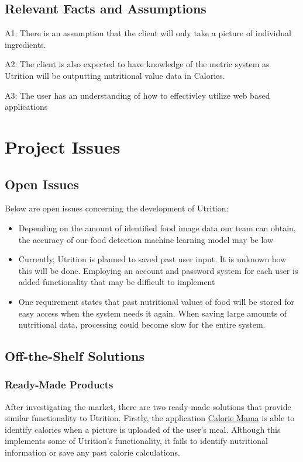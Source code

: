 \documentclass[12pt]{article}
\begin{document}
{\subsection{Relevant Facts and Assumptions } 


A1: There is an assumption that the client will only take a picture of individual ingredients. 

A2: The client is also expected to have knowledge of the metric system as Utrition will be outputting nutritional value data in Calories.

A3: The user has an understanding of how to effectivley utilize web based applications

\section{Project Issues}

\subsection{Open Issues}
Below are open issues concerning the development of Utrition:
\begin{itemize}
	\item Depending on the amount of identified food image data our team can obtain, the accuracy of our food detection machine learning model may be low
	\item Currently, Utrition is planned to saved past user input. It is unknown how this will be done. Employing an account and password system for each user is added functionality that may be difficult to implement 
	\item One requirement states that past nutritional values of food will be stored for easy access when the system needs it again. When saving large amounts of nutritional data, processing could become slow for the entire system.
\end{itemize}

\subsection{Off-the-Shelf Solutions}
\subsubsection{Ready-Made Products}
After investigating the market, there are two ready-made solutions that provide similar functionality to Utrition. Firstly, the application \href{https://www.caloriemama.ai/#Categories}{Calorie Mama} is able to identify calories when a picture is uploaded of the user's meal. Although this implements some of Utrition's functionality, it fails to identify nutritional information or save any past calorie calculations.

}
\end{document}
